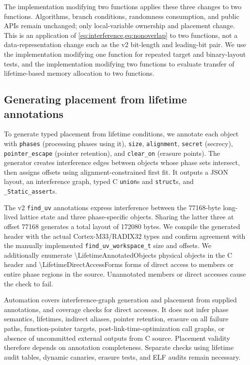 \documentclass[a4paper,10pt]{article}
\theoremstyle{definition}
\theoremstyle{remark}
\begin{document}
The implementation modifying two functions applies these three changes to two functions. Algorithms, branch conditions, randomness consumption, and public APIs remain unchanged; only local-variable ownership and placement change. This is an application of \cref{eq:interference,eq:nonoverlap} to two functions, not a data-representation change such as the v2 bit-length and leading-bit pair. We use the implementation modifying one function for repeated target and binary-layout tests, and the implementation modifying two functions to evaluate transfer of lifetime-based memory allocation to two functions.

\subsection{Generating placement from lifetime annotations}

To generate typed placement from lifetime conditions, we annotate each object with \texttt{phases} (processing phases using it), \texttt{size}, \texttt{alignment}, \texttt{secret} (secrecy), \texttt{pointer\_escape} (pointer retention), and \texttt{clear\_on} (erasure points). The generator creates interference edges between objects whose phase sets intersect, then assigns offsets using alignment-constrained first fit. It outputs a JSON layout, an interference graph, typed C \texttt{union}s and \texttt{struct}s, and \texttt{\_Static\_assert}s.

The v2 \texttt{find\_uv} annotations express interference between the \num{77168}-byte long-lived lattice state and three phase-specific objects. Sharing the latter three at offset \num{77168} generates a total layout of \num{172080} bytes. We compile the generated header with the actual Cortex-M33/RADIX32 types and confirm agreement with the manually implemented \texttt{find\_uv\_workspace\_t} size and offsets. We additionally enumerate \num{\LifetimeAnnotatedObjects} physical objects in the C header and \num{\LifetimeDirectAccessForms} forms of direct access to members or entire phase regions in the source. Unannotated members or direct accesses cause the check to fail.

Automation covers interference-graph generation and placement from supplied annotations, and coverage checks for direct accesses. It does not infer phase semantics, lifetimes, indirect aliases, pointer retention, erasure on all failure paths, function-pointer targets, post-link-time-optimization call graphs, or absence of uncommitted external outputs from C source. Placement validity therefore depends on annotation completeness. Separate checks using lifetime audit tables, dynamic canaries, erasure tests, and ELF audits remain necessary.
\end{document}
